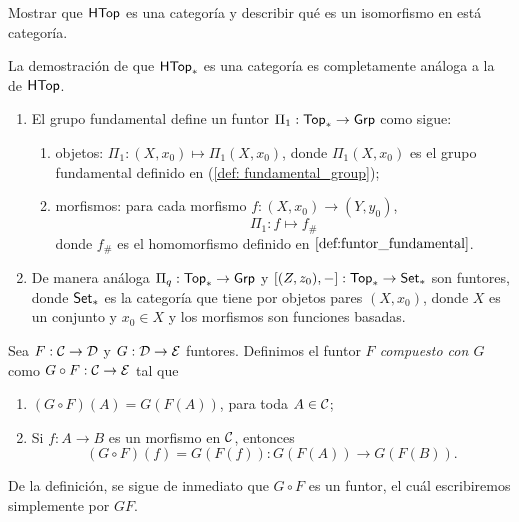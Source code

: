     \begin{ejercicio}
        Mostrar que $\textsf{HTop}$ es una categoría y describir qué es un isomorfismo en está categoría.
    \end{ejercicio}
    \begin{obs}
        La demostración de que $\textsf{HTop}_*$ es una categoría es completamente análoga a la de $\textsf{HTop}$.
    \end{obs}
    \begin{ejemplo}
    \begin{enumerate}[label = (\arabic*)]
        \item El grupo fundamental define un funtor $\Pi_1:\textsf{Top}_*\to \textsf{Grp}$ como sigue:
        \begin{enumerate}
        \item objetos: $\Pi_1:(X, x_0) \mapsto \Pi_1(X, x_0)$, donde $\Pi_1(X, x_0)$ es el  grupo fundamental definido en (\ref{def: fundamental_group});
        \item morfismos: para cada morfismo $f:(X,x_0)\to (Y,y_0)$, $$\Pi_1:f \mapsto f_\#$$ 
    donde $f_\#$ es el homomorfismo definido en $\ref{def:funtor_fundamental}$. 
        \end{enumerate}
    
    \item De manera análoga $\Pi_q:\textsf{Top}_*\to \textsf{Grp}$ y $[(Z,z_0),-]:\textsf{Top}_*\to \textsf{Set}_*$ son funtores, donde $\textsf{Set}_*$ es la categoría que tiene por objetos pares $(X,x_0)$, donde $X$ es un conjunto y $x_0\in X$ y los morfismos son funciones basadas.
    \end{enumerate}
    \end{ejemplo}
\begin{definicion}
    Sea $F:\mathcal{C}\to\mathcal{D}$ y $G:\mathcal{D}\to\mathcal{E}$ funtores. Definimos el funtor \textit{$F$ compuesto con $G$} como $G\circ F:\mathcal{C}\to\mathcal{E}$ tal que
    \begin{enumerate}[label=(\arabic*)]
        \item $(G\circ F)(A)=G(F(A))$, para toda $A\in\mathcal{C}$;
        \item Si $f:A\to B$ es un morfismo en $\mathcal{C}$, entonces 
        $$(G\circ F)(f)=G(F(f)):G(F(A))\to G(F(B)).$$
    \end{enumerate}
    \begin{obs}
        De la definición, se sigue de inmediato que $G\circ F$ es un funtor, el cuál escribiremos simplemente por $GF$.
    \end{obs}
\end{definicion}
